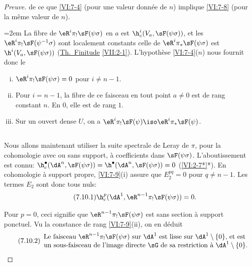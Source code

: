 \begin{proof}[Preuve]
de ce que \ref{VI:7-4} (pour une valeur donnée de $n$) implique \ref{VI:7-8} 
(pour la même valeur de $n$). 

\begingroup
\emergencystretch=2em\relax
La fibre de $\eR^i \pi_! \sF(\psi\sigma)$ en $a$ est 
$\h_c^i(V_a,\sF(\psi\sigma))$, et  les 
$\eR^i \pi_!\sF(\psi^{-1}\sigma)$ sont localement constants celle de 
$\eR^i \pi_\ast \sF(\psi\sigma)$ est $\h^i(V_a,\sF(\psi\sigma))$ 
(\hyperref[VII]{Th.\ Finitude} \ref{VII:2-1}). L'hypothèse \ref{VI:7-4}($n$) 
nous fournit donc le\par
\endgroup 





\begin{lemma_}\label{VI:7-9}
\begin{enumerate}[(i)]
  \item $\eR^i \pi_! \sF(\psi\sigma)=0$ pour $i\ne n-1$. 
  \item Pour $i=n-1$, la fibre de ce faisceau en tout point $a\ne 0$ est de rang 
    constant $n$. En $0$, elle est de rang $1$. 
  \item Sur un ouvert dense $U$, on a 
    $\eR^i \pi_! \sF(\psi) \iso \eR^i \pi_\ast \sF(\psi)$. 
\end{enumerate}
\end{lemma_}





\subsection{}\label{VI:7-10}

Nous allons maintenant utiliser la suite spectrale de Leray de $\pi$, pour la 
cohomologie avec ou sans support, à coefficients dans $\sF(\psi\sigma)$. 
L'aboutissement est connu: 
$\h_c^\bullet(\dA^n,\sF(\psi\sigma))=\h^\bullet(\dA^n,\sF(\psi\sigma)) = 0$ 
(\ref{VI:2-7*}*). En cohomologie à support propre, \ref{VI:7-9}(i) assure que 
$E_2^{pq}=0$ pour $q\ne n-1$. Les termes $E_2$ sont donc tous nuls: 
\begin{equation*}\tag{7.10.1}\label{VI:eq:7-10-1}
  \h_c^p(\dA^1,\eR^{n-1} \pi_!\sF(\psi\sigma)) = 0 \text{.} 
\end{equation*}

Pour $p=0$, ceci signifie que $\eR^{n-1}\pi_! \sF(\psi\sigma)$ est sans section 
à support ponctuel. Vu la constance de rang \ref{VI:7-9}(ii), on en déduit 
\begin{equation*}\tag{7.10.2}\label{VI:eq:7-10-2}
  \begin{array}{c}
    \text{Le faisceau $\eR^{n-1} \pi_! \sF(\psi\sigma)$ sur $\dA^1$ est lisse sur $\dA^1\setminus \{0\}$, et est } \\ 
    \text{un sous-faisceau de l'image directe $\sG$ de sa restriction à $\dA^1\setminus \{0\}$.}
  \end{array}
\end{equation*}


\end{proof}
